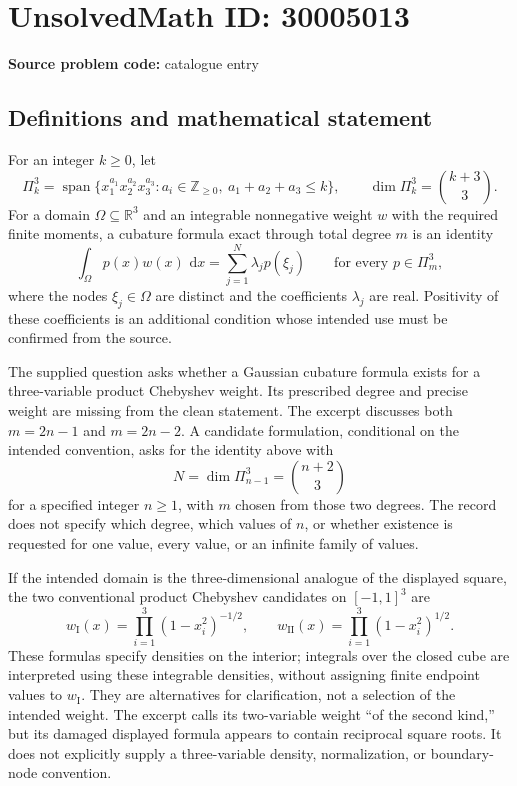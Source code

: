 \documentclass[11pt]{article}
\newcommand{\Z}{\mathbb{Z}}
\newcommand{\R}{\mathbb{R}}
\newcommand{\dd}{\,\mathrm{d}}
\begin{document}
\section*{UnsolvedMath ID: 30005013}
\textbf{Source problem code:} catalogue entry
\subsection{Definitions and mathematical statement}
For an integer \(k\geq 0\), let
\[
\Pi_k^3=\operatorname{span}\{x_1^{a_1}x_2^{a_2}x_3^{a_3}:a_i\in\Z_{\geq0},\ a_1+a_2+a_3\leq k\},
\qquad \dim\Pi_k^3=\binom{k+3}{3}.
\]
For a domain \(\Omega\subseteq\R^3\) and an integrable nonnegative weight \(w\) with the required finite moments, a cubature formula exact through total degree \(m\) is an identity
\[
\int_\Omega p(x)w(x)\,\dd x
=\sum_{j=1}^{N}\lambda_jp(\xi_j)
\qquad\text{for every }p\in\Pi_m^3,
\]
where the nodes \(\xi_j\in\Omega\) are distinct and the coefficients \(\lambda_j\) are real. Positivity of these coefficients is an additional condition whose intended use must be confirmed from the source.

The supplied question asks whether a Gaussian cubature formula exists for a three-variable product Chebyshev weight. Its prescribed degree and precise weight are missing from the clean statement. The excerpt discusses both \(m=2n-1\) and \(m=2n-2\). A candidate formulation, conditional on the intended convention, asks for the identity above with
\[
N=\dim\Pi_{n-1}^3=\binom{n+2}{3}
\]
for a specified integer \(n\geq1\), with \(m\) chosen from those two degrees. The record does not specify which degree, which values of \(n\), or whether existence is requested for one value, every value, or an infinite family of values.

If the intended domain is the three-dimensional analogue of the displayed square, the two conventional product Chebyshev candidates on \([-1,1]^3\) are
\[
w_{\mathrm{I}}(x)=\prod_{i=1}^{3}(1-x_i^2)^{-1/2},
\qquad
w_{\mathrm{II}}(x)=\prod_{i=1}^{3}(1-x_i^2)^{1/2}.
\]
These formulas specify densities on the interior; integrals over the closed cube are interpreted using these integrable densities, without assigning finite endpoint values to \(w_{\mathrm{I}}\). They are alternatives for clarification, not a selection of the intended weight. The excerpt calls its two-variable weight ``of the second kind,'' but its damaged displayed formula appears to contain reciprocal square roots. It does not explicitly supply a three-variable density, normalization, or boundary-node convention.
\end{document}
